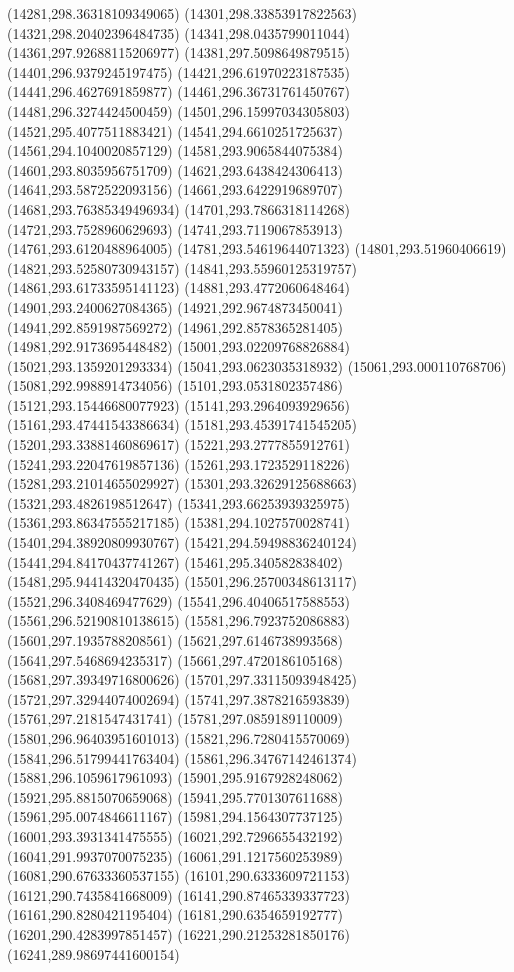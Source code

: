 {(14281,298.36318109349065)
(14301,298.33853917822563)
(14321,298.20402396484735)
(14341,298.0435799011044)
(14361,297.92688115206977)
(14381,297.5098649879515)
(14401,296.9379245197475)
(14421,296.61970223187535)
(14441,296.4627691859877)
(14461,296.36731761450767)
(14481,296.3274424500459)
(14501,296.15997034305803)
(14521,295.4077511883421)
(14541,294.6610251725637)
(14561,294.1040020857129)
(14581,293.9065844075384)
(14601,293.8035956751709)
(14621,293.6438424306413)
(14641,293.5872522093156)
(14661,293.6422919689707)
(14681,293.76385349496934)
(14701,293.7866318114268)
(14721,293.7528960629693)
(14741,293.7119067853913)
(14761,293.6120488964005)
(14781,293.54619644071323)
(14801,293.51960406619)
(14821,293.52580730943157)
(14841,293.55960125319757)
(14861,293.61733595141123)
(14881,293.4772060648464)
(14901,293.2400627084365)
(14921,292.9674873450041)
(14941,292.8591987569272)
(14961,292.8578365281405)
(14981,292.9173695448482)
(15001,293.02209768826884)
(15021,293.1359201293334)
(15041,293.0623035318932)
(15061,293.000110768706)
(15081,292.9988914734056)
(15101,293.0531802357486)
(15121,293.15446680077923)
(15141,293.2964093929656)
(15161,293.47441543386634)
(15181,293.45391741545205)
(15201,293.33881460869617)
(15221,293.2777855912761)
(15241,293.22047619857136)
(15261,293.1723529118226)
(15281,293.21014655029927)
(15301,293.32629125688663)
(15321,293.4826198512647)
(15341,293.66253939325975)
(15361,293.86347555217185)
(15381,294.1027570028741)
(15401,294.38920809930767)
(15421,294.59498836240124)
(15441,294.84170437741267)
(15461,295.340582838402)
(15481,295.94414320470435)
(15501,296.25700348613117)
(15521,296.3408469477629)
(15541,296.40406517588553)
(15561,296.52190810138615)
(15581,296.7923752086883)
(15601,297.1935788208561)
(15621,297.6146738993568)
(15641,297.5468694235317)
(15661,297.4720186105168)
(15681,297.39349716800626)
(15701,297.33115093948425)
(15721,297.32944074002694)
(15741,297.3878216593839)
(15761,297.2181547431741)
(15781,297.0859189110009)
(15801,296.96403951601013)
(15821,296.7280415570069)
(15841,296.51799441763404)
(15861,296.34767142461374)
(15881,296.1059617961093)
(15901,295.9167928248062)
(15921,295.8815070659068)
(15941,295.7701307611688)
(15961,295.0074846611167)
(15981,294.1564307737125)
(16001,293.3931341475555)
(16021,292.7296655432192)
(16041,291.9937070075235)
(16061,291.1217560253989)
(16081,290.67633360537155)
(16101,290.6333609721153)
(16121,290.7435841668009)
(16141,290.87465339337723)
(16161,290.8280421195404)
(16181,290.6354659192777)
(16201,290.4283997851457)
(16221,290.21253281850176)
(16241,289.98697441600154)
}
